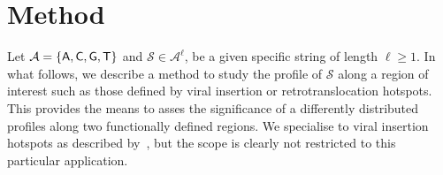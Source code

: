 \documentclass{bioinfo}
\begin{document}
\section{Method}
Let $\mathcal A = \{\sf A, C, G, T\}$ and $\mathcal S \in \mathcal A^\ell$, be a given specific string of length $\ell\geq 1$. %
In what follows, we describe a method to study the profile of $\mathcal S$ along a region of interest such as those defined by viral insertion or retrotranslocation hotspots. This provides the means to asses the significance of a differently distributed profiles along two functionally defined regions. We specialise to viral insertion hotspots as described by~\cite{IRAMM}, but the scope is clearly not restricted to this particular application. 
\end{document}
